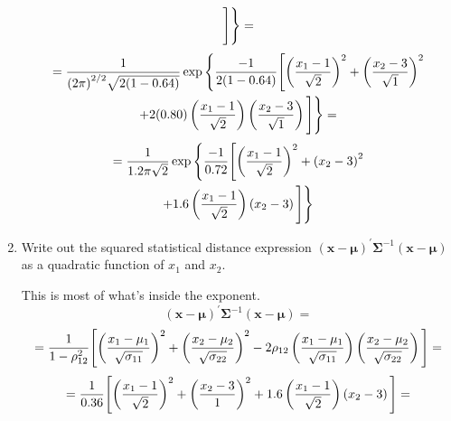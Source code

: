 \begin{enumerate}[label=(\alph*)]
\begin{multline*}
            \Bigg{]}
        \Bigg{\}}
        =
    \end{multline*}
    \begin{multline*}
        =
        \frac{1}{{(2\pi)}^{2/2}\sqrt{2(1-0.64)}}
        \exp
        \Bigg{\{}
            \frac{-1}{2(1-0.64)}
            \Bigg{[}
                {\left(\frac{x_1 - 1}{\sqrt{2}}\right)}^{2}
                +
                {\left(\frac{x_2 - 3}{\sqrt{1}}\right)}^{2} \\
                +
                2(0.80)
                \left(\frac{x_1 - 1}{\sqrt{2}}\right)
                \left(\frac{x_2 - 3}{\sqrt{1}}\right)
            \Bigg{]}
        \Bigg{\}}
        =
    \end{multline*}
    \begin{multline*}
        =
        \frac{1}{1.2\pi\sqrt{2}}
        \exp
        \Bigg{\{}
            \frac{-1}{0.72}
            \Bigg{[}
                {\left(\frac{x_1 - 1}{\sqrt{2}}\right)}^{2}
                +
                {\left(x_2 - 3\right)}^{2} \\
                +
                1.6
                \left(\frac{x_1 - 1}{\sqrt{2}}\right)
                \left(x_2 - 3\right)
            \Bigg{]}
        \Bigg{\}}
    \end{multline*}
    \item Write out the squared statistical distance expression ${(\textbf{x} - \bm{\mu})}^{\prime}\bm{\Sigma}^{-1}{(\textbf{x} - \bm{\mu})}$ as a quadratic
    function of $x_1$ and $x_2$.
    \par
    This is most of what's inside the exponent.
    \[
        {(\textbf{x} - \bm{\mu})}^{\prime}\bm{\Sigma}^{-1}{(\textbf{x} - \bm{\mu})}
        =
    \]
    \[
        =
        \frac{1}{1-\rho_{12}^2}
        \Bigg{[}
            {\left(\frac{x_1 - \mu_1}{\sqrt{\sigma_{11}}}\right)}^{2}
            +
            {\left(\frac{x_2 - \mu_2}{\sqrt{\sigma_{22}}}\right)}^{2} \\
            -
            2\rho_{12}
            \left(\frac{x_1 - \mu_1}{\sqrt{\sigma_{11}}}\right)
            \left(\frac{x_2 - \mu_2}{\sqrt{\sigma_{22}}}\right)
        \Bigg{]}
        =
    \]
    \[
        =
        \frac{1}{0.36}
        \Bigg{[}
            {\left(\frac{x_1 - 1}{\sqrt{2}}\right)}^{2}
            +
            {\left(\frac{x_2 - 3}{1}\right)}^{2} \\
            +
            1.6
            \left(\frac{x_1 - 1}{\sqrt{2}}\right)
            \left(x_2 - 3\right)
        \Bigg{]}
        =
    \]
    \[
\]
\end{enumerate}
